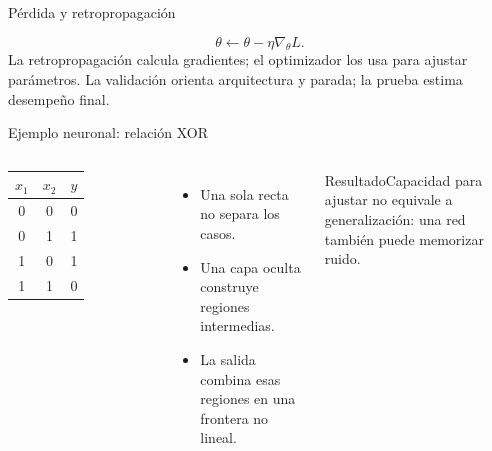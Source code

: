 \documentclass[aspectratio=169,10pt]{beamer}
\begin{document}
\begin{frame}{Pérdida y retropropagación}
  \begin{center}
  \end{center}
  \[
    \theta\leftarrow\theta-\eta\nabla_{\theta}L.
  \]
  \small La retropropagación calcula gradientes; el optimizador los usa para ajustar parámetros. La validación orienta arquitectura y parada; la prueba estima desempeño final.
\end{frame}

\begin{frame}{Ejemplo neuronal: relación XOR}
  \begin{columns}[T]
    \centering
    \begin{tabular}{ccc}\toprule
    $x_1$ & $x_2$ & $y$\\\midrule
    0&0&0\\0&1&1\\1&0&1\\1&1&0\\\bottomrule
    \end{tabular}
    \begin{itemize}
      \item Una sola recta no separa los casos.
      \item Una capa oculta construye regiones intermedias.
      \item La salida combina esas regiones en una frontera no lineal.
    \end{itemize}
    \begin{block}{Resultado}Capacidad para ajustar no equivale a generalización: una red también puede memorizar ruido.\end{block}
  \end{columns}
\end{frame}
\end{document}
